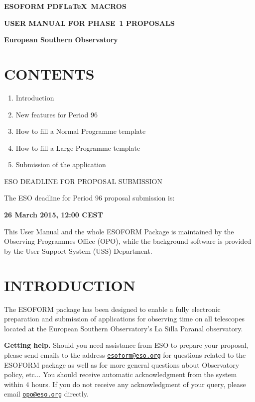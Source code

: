 \documentclass{article}
\begin{document}
\centerline{{\Large{\bf ESOFORM PDF\LaTeX\ MACROS}}}
\bigskip
\centerline{{\Large{\bf USER MANUAL FOR PHASE~1 PROPOSALS }}}
\bigskip
\centerline{{\bf European Southern Observatory }}
\vspace{3cm}

\def\period{96}

\section*{CONTENTS} 

\begin{enumerate}  
\item Introduction 
\item New features for Period 96
\item How to fill a Normal Programme template 
\item How to fill a Large  Programme template 
\item Submission of the application 
\end{enumerate} 

\vspace{3.0truecm}

\centerline{\large ESO DEADLINE FOR PROPOSAL SUBMISSION }
\medskip
\centerline{The ESO deadline for Period 96 proposal submission is:}
\medskip
\centerline{\huge \bf 26 March 2015, 12:00 CEST}

\vfill

\noindent This User Manual and the whole ESOFORM Package is
maintained by the Observing Programmes Office (OPO),
while the background software
is provided by the User Support System (USS) Department.

\break

\section{INTRODUCTION}

The ESOFORM package has been designed to enable a fully
electronic preparation and submission of applications for observing
time on all telescopes located at the European Southern Observatory's
La Silla Paranal observatory.

{\bf Getting help.} Should you need assistance from ESO to prepare
your proposal, please send emails to the address
\href{mailto:esoform@eso.org}{\tt esoform@eso.org} for questions
related to the ESOFORM package as well as for more general questions
about Observatory policy, etc...
You should receive automatic acknowledgment from the system within 
4 hours. If you do not receive any acknowledgment of your query, 
please email 
\href{mailto:opo@eso.org}{\tt opo@eso.org} directly.
\end{document}
